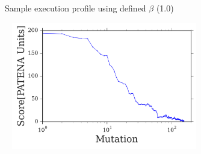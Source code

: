 \documentclass{beamer}
\begin{document}
% 
\begin{frame}[plain]{Sample execution profile using defined $\beta$ (1.0)}
\begin{adjustwidth}{-1.5em}{-2.5em}
\centering

\includegraphics[width=330px,height=210px]{../img/iterationVsScore-individualBeta1-EXAMPLE.png}

\end{adjustwidth}
\end{frame}








% 
\end{document}
